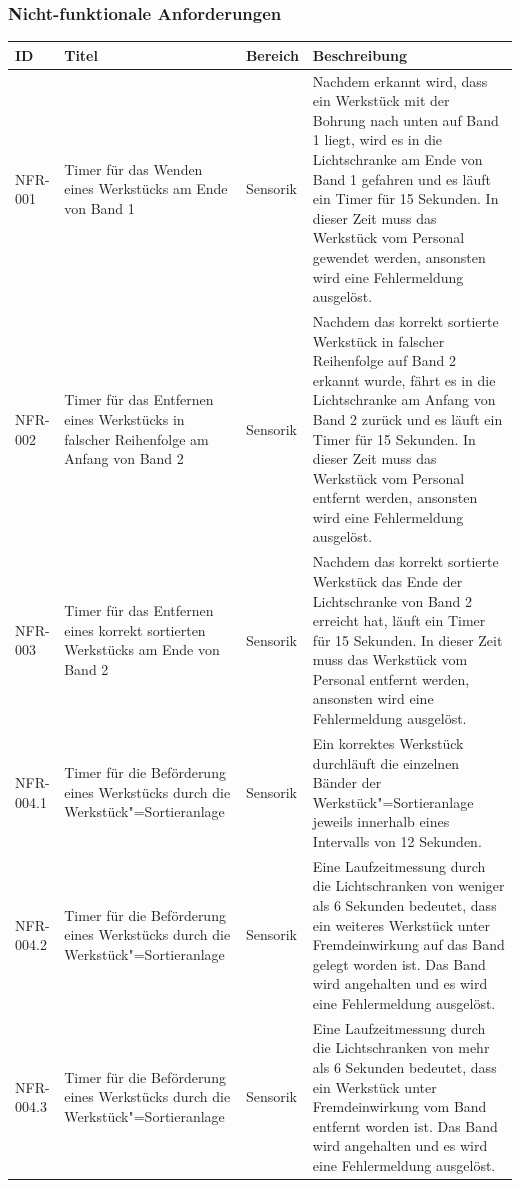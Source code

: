 \documentclass[oneside,a4paper,titlepage]{scrartcl} %
\begin{document}
\subsubsection{Nicht-funktionale Anforderungen}
\begin{small}
 \begin{longtable}{|p{2cm}|p{4cm}|p{1.5cm}|p{5.5cm}|}
  \hline
  \textbf{ID} & \textbf{Titel} & \textbf{Bereich} & \textbf{Beschreibung}\\
  \toprule
  \endhead
  \hline
  NFR-001 & Timer für das Wenden eines Werkstücks am Ende von Band 1 & Sensorik & Nachdem erkannt wird, dass ein Werkstück mit der Bohrung nach unten auf Band 1 liegt, wird es in die Lichtschranke am Ende von Band 1 gefahren und es läuft ein Timer für 15 Sekunden. In dieser Zeit muss das Werkstück vom Personal gewendet werden, ansonsten wird eine Fehlermeldung ausgelöst.\\
  \hline
  \rowcolor{lightgray} NFR-002 & Timer für das Entfernen eines Werkstücks in falscher Reihenfolge am Anfang von Band 2 & Sensorik & Nachdem das korrekt sortierte Werkstück in falscher Reihenfolge auf Band 2 erkannt wurde, fährt es in die Lichtschranke am Anfang von Band 2 zurück und es läuft ein Timer für 15 Sekunden. In dieser Zeit muss das Werkstück vom Personal entfernt werden, ansonsten wird eine Fehlermeldung ausgelöst.\\
  \hline
  NFR-003 & Timer für das Entfernen eines korrekt sortierten Werkstücks am Ende von Band 2 & Sensorik & Nachdem das korrekt sortierte Werkstück das Ende der Lichtschranke von Band 2 erreicht hat, läuft ein Timer für 15 Sekunden. In dieser Zeit muss das Werkstück vom Personal entfernt werden, ansonsten wird eine Fehlermeldung ausgelöst.\\
  \hline
  \rowcolor{lightgray} NFR-004.1 & Timer für die Beförderung eines Werkstücks durch die Werkstück"=Sortieranlage & Sensorik & Ein korrektes Werkstück durchläuft die einzelnen Bänder der Werkstück"=Sortieranlage jeweils innerhalb eines Intervalls von 12 Sekunden.\\
  \hline
  \rowcolor{lightgray} NFR-004.2 & Timer für die Beförderung eines Werkstücks durch die Werkstück"=Sortieranlage & Sensorik & Eine Laufzeitmessung durch die Lichtschranken von weniger als 6 Sekunden bedeutet, dass ein weiteres Werkstück unter Fremdeinwirkung auf das Band gelegt worden ist. Das Band wird angehalten und es wird eine Fehlermeldung ausgelöst.\\
  \hline
  \rowcolor{lightgray} NFR-004.3 & Timer für die Beförderung eines Werkstücks durch die Werkstück"=Sortieranlage & Sensorik & Eine Laufzeitmessung durch die Lichtschranken von mehr als 6 Sekunden bedeutet, dass ein Werkstück unter Fremdeinwirkung vom Band entfernt worden ist. Das Band wird angehalten und es wird eine Fehlermeldung ausgelöst.\\

\end{longtable}
\end{small}
\end{document}
